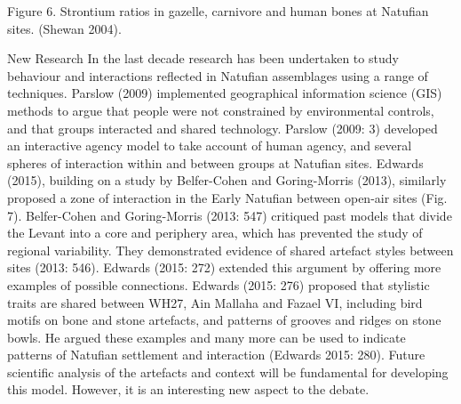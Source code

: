 \documentclass[%
	]{ijsra}
\begin{document}
Figure 6. Strontium ratios in gazelle, carnivore and human bones at Natufian sites. (Shewan 2004).

New Research
In the last decade research has been undertaken to study behaviour and interactions reflected in Natufian assemblages using a range of techniques. Parslow (2009) implemented geographical information science (GIS) methods to argue that people were not constrained by environmental controls, and that groups interacted and shared technology. Parslow (2009: 3) developed an interactive agency model to take account of human agency, and several spheres of interaction within and between groups at Natufian sites. Edwards (2015), building on a study by Belfer-Cohen and Goring-Morris (2013), similarly proposed a zone of interaction in the Early Natufian between open-air sites (Fig. 7). Belfer-Cohen and Goring-Morris (2013: 547) critiqued past models that divide the Levant into a core and periphery area, which has prevented the study of regional variability. They demonstrated evidence of shared artefact styles between sites (2013: 546). Edwards (2015: 272) extended this argument by offering more examples of possible connections. Edwards (2015: 276) proposed that stylistic traits are shared between WH27, Ain Mallaha and Fazael VI, including bird motifs on bone and stone artefacts, and patterns of grooves and ridges on stone bowls. He argued these examples and many more can be used to indicate patterns of Natufian settlement and interaction (Edwards 2015: 280). Future scientific analysis of the artefacts and context will be fundamental for developing this model. However, it is an interesting new aspect to the debate.
\end{document}
